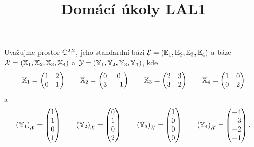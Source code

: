 \documentclass{article}
\title{Domácí úkoly LAL1}
\newcommand{\mathbasis}{\ensuremath{\mathcal}}
\newcommand{\mathfield}{\ensuremath{\mathbb}}
\newcommand{\mathmat}{\ensuremath{\mathbb}}
\begin{document}
\maketitle

\begin{Exercise}[name=Úkol]
	Uvažujme prostor \( \mathfield{C}^{2, 2} \), jeho standardní bázi \( \mathbasis{E} = \left( \mathmat{E}_1, \mathmat{E}_2, \mathmat{E}_3, \mathmat{E}_4 \right) \) a báze \( \mathbasis{X} = \left( \mathmat{X}_1, \mathmat{X}_2, \mathmat{X}_3, \mathmat{X}_4 \right) \) a \( \mathbasis{Y} = \left( \mathmat{Y}_1, \mathmat{Y}_2, \mathmat{Y}_3, \mathmat{Y}_4 \right) \), kde
	\[
		\mathmat{X}_1 = \begin{pmatrix} 1 & 2 \\ 0 & 1 \end{pmatrix} \qquad
		\mathmat{X}_2 = \begin{pmatrix} 0 & 0 \\ 3 & -1 \end{pmatrix} \qquad
		\mathmat{X}_3 = \begin{pmatrix} 2 & 3 \\ 3 & 2 \end{pmatrix} \qquad
		\mathmat{X}_4 = \begin{pmatrix} 1 & 0 \\ 0 & 2 \end{pmatrix}
	\]
	a
	\[
		\left( \mathmat{Y}_1 \right)_\mathbasis{X} = \begin{pmatrix} 1 \\ 1 \\ 0 \\ 1 \end{pmatrix} \qquad
		\left( \mathmat{Y}_2 \right)_\mathbasis{X} = \begin{pmatrix} 0 \\ 1 \\ 0 \\ 2 \end{pmatrix} \qquad
		\left( \mathmat{Y}_3 \right)_\mathbasis{X} = \begin{pmatrix} 1 \\ 0 \\ 0 \\ 0 \end{pmatrix} \qquad
		\left( \mathmat{Y}_4 \right)_\mathbasis{X} = \begin{pmatrix} -4 \\ -3 \\ -2 \\ -1 \end{pmatrix} \text{.}
\]
\end{Exercise}
\end{document}
